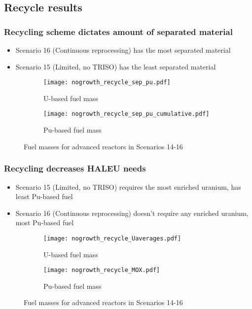 \subsection{Recycle results}

\begin{frame}
    \frametitle{Recycling scheme dictates amount of separated material}
    \begin{itemize}
        \item Scenario 16 (Continuous reprocessing) has the 
              most separated material 
        \item Scenario 15 (Limited, no TRISO) has the least separated 
              material
    \end{itemize}
    \begin{figure}
        \centering
        \begin{subfigure}{0.48\textwidth}
            \texttt{[image: nogrowth\_recycle\_sep\_pu.pdf]}
            \caption{U-based fuel mass}
        \end{subfigure}
        \hfill
        \begin{subfigure}{0.48\textwidth}
            \texttt{[image: nogrowth\_recycle\_sep\_pu\_cumulative.pdf]}
            \caption{Pu-based fuel mass}
        \end{subfigure}
        \caption{Fuel masses for advanced reactors in Scenarios 14-16}
        \label{fig:recycle_sep_pu}
    \end{figure}
\end{frame}

\begin{frame}
    \frametitle{Recycling decreases HALEU needs}
    \begin{itemize}
        \item Scenario 15 (Limited, no TRISO) requires the most 
              enriched uranium, has least Pu-based fuel
        \item Scenario 16 (Continuous reprocessing) doesn't 
              require any enriched uranium, most Pu-based fuel
    \end{itemize}
    \begin{figure}
        \centering
        \begin{subfigure}{0.48\textwidth}
            \texttt{[image: nogrowth\_recycle\_Uaverages.pdf]}
            \caption{U-based fuel mass}
        \end{subfigure}
        \hfill
        \begin{subfigure}{0.48\textwidth}
            \texttt{[image: nogrowth\_recycle\_MOX.pdf]}
            \caption{Pu-based fuel mass}
        \end{subfigure}
        \caption{Fuel masses for advanced reactors in Scenarios 14-16}
        \label{fig:recycle_fuel}
    \end{figure}
\end{frame}